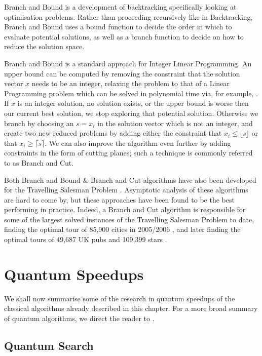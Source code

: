 Branch and Bound is a development of backtracking specifically looking at optimisation problems. Rather than proceeding recursively like in Backtracking, Branch and Bound uses a bound function to decide the order in which to evaluate potential solutions, as well as a branch function to decide on how to reduce the solution space.

Branch and Bound is a standard approach for Integer Linear Programming. An upper bound can be computed by removing the constraint that the solution vector $x$ needs to be an integer, relaxing the problem to that of a Linear Programming problem which can be solved in polynomial time via, for example, \cite{cohen2019}. If $x$ is an integer solution, no solution exists, or the upper bound is worse then our current best solution, we stop exploring that potential solution. Otherwise we branch by choosing an $s = x_i$ in the solution vector which is not an integer, and create two new reduced problems by adding either the constraint that $x_i \leq \lfloor s \rfloor$ or that $x_i \geq \lceil s \rceil$. We can also improve the algorithm even further by adding constraints in the form of cutting planes; such a technique is commonly referred to as Branch and Cut.

Both Branch and Bound \& Branch and Cut algorithms have also been developed for the Travelling Salesman Problem \cite{little1963, padberg1991}. Asymptotic analysis of these algorithms are hard to come by, but these approaches have been found to be the best performing in practice. Indeed, a Branch and Cut algorithm is responsible for some of the largest solved instances of the Travelling Salesman Problem to date, finding the optimal tour of 85,900 cities in 2005/2006 \cite{applegate2006}, and later finding the optimal tours of 49,687 UK pubs and 109,399 stars \cite{tspuk49687}.

\section{Quantum Speedups}

We shall now summarise some of the research in quantum speedups of the classical algorithms already described in this chapter. For a more broad summary of quantum algorithms, we direct the reader to \cite{montanaro2016}.

\subsection{Quantum Search}

